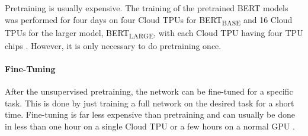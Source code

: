 Pretraining is usually expensive.
The training of the pretrained BERT models was performed for four days on four Cloud TPUs for BERT\textsubscript{BASE} and 16 Cloud TPUs for the larger model, BERT\textsubscript{LARGE}, with each Cloud TPU having four TPU chips \cite[p.~13]{devlin2018bert}.
However, it is only necessary to do pretraining once.

\paragraph{Fine-Tuning}

After the unsupervised pretraining, the network can be fine-tuned for a specific task.
This is done by just training a full network on the desired task for a short time.
Fine-tuning is far less expensive than pretraining and can usually be done in less than one hour on a single Cloud TPU or a few hours on a normal GPU \cite[p.~5]{devlin2018bert}.

